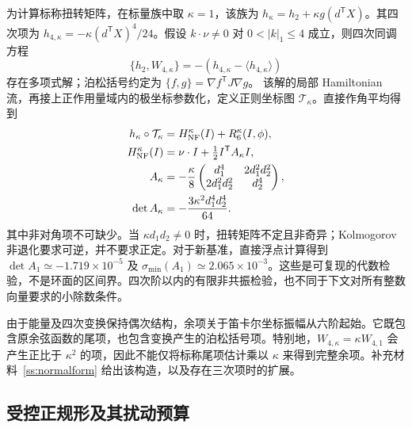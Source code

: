 为计算标称扭转矩阵，在标量族中取 $\kappa=1$，该族为 $h_\kappa=h_2+\kappa g(d^{\mathsf T}X)$。其四次项为 $h_{4,\kappa}=-\kappa(d^{\mathsf T}X)^4/24$。假设
$k\cdot\nu\ne0$ 对 $0<|k|_1\le4$ 成立，则四次同调方程
\begin{equation}\label{kam:homological}
 \{h_2,W_{4,\kappa}\}
    =-(h_{4,\kappa}-\langle h_{4,\kappa}\rangle)
\end{equation}
存在多项式解；泊松括号约定为
$\{f,g\}=\nabla f^{\mathsf T}J\nabla g$。
该解的局部 Hamiltonian 流，再接上正作用量域内的极坐标参数化，定义正则坐标图 $\mathcal T_\kappa$。直接作角平均得到
\begin{equation}\label{kam:magnetic-twist}
\begin{aligned}
 h_\kappa\circ\mathcal T_\kappa
       &=H_{\rm NF}^{\kappa}(I)+R_6^\kappa(I,\phi),\\
 H_{\rm NF}^{\kappa}(I)
       &=\nu\cdot I+\tfrac12I^{\mathsf T}A_\kappa I,\\
 A_\kappa&=-\frac{\kappa}{8}
 \begin{pmatrix}
 d_1^4&2d_1^2d_2^2\\
 2d_1^2d_2^2&d_2^4
 \end{pmatrix},\\
 \det A_\kappa&=-\frac{3\kappa^2d_1^4d_2^4}{64}.
\end{aligned}
\end{equation}
其中非对角项不可缺少。当 $\kappa d_1d_2\ne0$ 时，扭转矩阵不定且非奇异；Kolmogorov 非退化要求可逆，并不要求正定。对于新基准，直接浮点计算得到
$\det A_1\simeq-1.719\times10^{-5}$ 及
$\sigma_{\min}(A_1)\simeq2.065\times10^{-3}$。这些是可复现的代数检验，不是环面的区间界。四次阶以内的有限非共振检验，也不同于下文对所有整数向量要求的小除数条件。

由于能量及四次变换保持偶次结构，余项关于笛卡尔坐标振幅从六阶起始。它既包含原余弦函数的尾项，也包含变换产生的泊松括号项。特别地，$W_{4,\kappa}=\kappa W_{4,1}$ 会产生正比于 $\kappa^2$ 的项，因此不能仅将标称尾项估计乘以 $\kappa$ 来得到完整余项。补充材料~\ref{ss:normalform} 给出该构造，以及存在三次项时的扩展。

\subsection{受控正规形及其扰动预算}
\label{kam:closed-budget-section}

